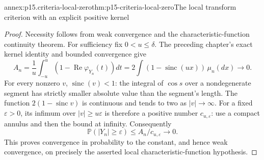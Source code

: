 \begin{annexitem}{annex:p15.criteria-local-zero}{thm:p15-criteria-local-zero}{The local transform criterion with an explicit positive kernel}
\begin{proof}
Necessity follows from weak convergence and the
characteristic-function continuity theorem.
For sufficiency fix \(0<u\leq\delta\).
The preceding chapter's exact kernel identity and
bounded convergence give
\[
 A_n=\frac1u\int_{-u}^u(1-\operatorname{Re}\varphi_{Y_n}(t))dt
   =2\int(1-\operatorname{sinc}(ux))\,\mu_n(dx)\longrightarrow0.
\]
For every nonzero \(v\), \(\operatorname{sinc}(v)<1\):
the integral of \(\cos s\) over a nondegenerate segment
has strictly smaller absolute value than the segment's
length. The function \(2(1-\operatorname{sinc}v)\)
is continuous and tends to two as \(|v|\to\infty\).
For a fixed \(\varepsilon>0\), its infimum over
\(|v|\geq u\varepsilon\) is therefore a positive number
\(c_{u,\varepsilon}\): use a compact annulus and then
the bound at infinity.
Consequently
\[
 \mathbb P(|Y_n|\geq\varepsilon)
                 \leq A_n/c_{u,\varepsilon}\longrightarrow0.
\]
This proves convergence in probability to the constant,
and hence weak convergence, on precisely the asserted
local characteristic-function hypothesis.
\end{proof}
\end{annexitem}

